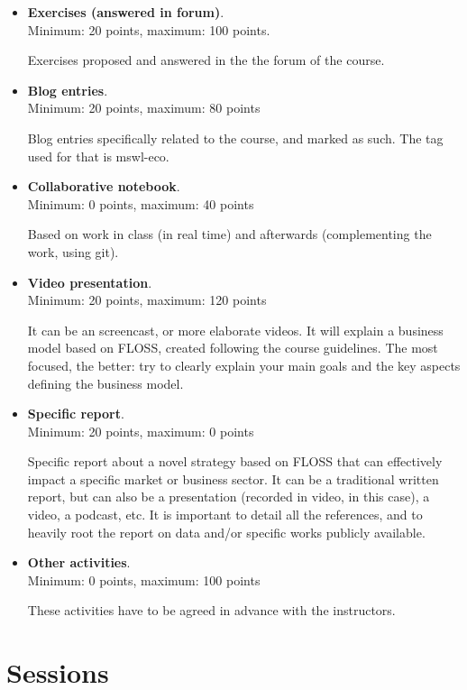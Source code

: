 \documentclass[a4paper]{article}
\begin{document}
\begin{itemize}
\item \textbf{Exercises (answered in forum)}. \\
  Minimum: 20 points, maximum: 100 points.

  Exercises proposed and answered in the the forum of the course.

\item \textbf{Blog entries}. \\
  Minimum: 20 points, maximum: 80 points

  Blog entries specifically related to the course, and marked as such. The tag used for that is mswl-eco.

\item \textbf{Collaborative notebook}. \\
  Minimum: 0 points, maximum: 40 points

  Based on work in class (in real time) and afterwards (complementing the work, using git).

\item \textbf{Video presentation}. \\
  Minimum: 20 points, maximum: 120 points

  It can be an screencast, or more elaborate videos. It will explain a business model based on FLOSS, created following the course guidelines. 
  The most focused, the better: try to clearly explain your main goals and the key aspects defining the business model.

\item \textbf{Specific report}. \\
  Minimum: 20 points, maximum: 0 points

 Specific report about a novel strategy based on FLOSS that can effectively impact a specific market or business sector.
 It can be a traditional written report, but can also be a presentation (recorded in video, in this case), a video, a podcast, etc. 
 It is important to detail all the references, and to heavily root the report on data and/or specific works publicly available.

\item \textbf{Other activities}. \\
  Minimum: 0 points, maximum: 100 points

  These activities have to be agreed in advance with the instructors.
\end{itemize}

\section{Sessions}
\end{document}
